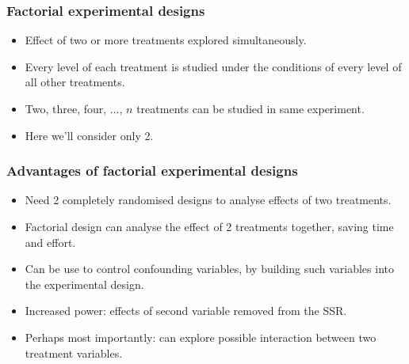 \documentclass[12pt,xcolor=dvipsnames,handout,mathserif,aspectratio=169]{beamer}
\begin{document}
\begin{frame}
\frametitle{Factorial experimental designs}
\begin{itemize}
\item Effect of two or more treatments explored simultaneously.
\vspace{0.3cm}
\item Every level of each treatment is studied under the conditions of every level of all other treatments.
\vspace{0.3cm}
\item Two, three, four, $\ldots$, $n$ treatments can be studied in same experiment.
\vspace{0.3cm}
\item Here we'll consider only 2.
\end{itemize}
\end{frame}

\begin{frame}
\frametitle{Advantages of factorial experimental designs}
\begin{itemize}
\vspace{0.3cm}
\item Need 2 completely randomised designs to analyse effects of two treatments.
\vspace{0.3cm}
\item Factorial design can analyse the effect of 2 treatments together, saving time and effort.
\vspace{0.3cm}
\item Can be use to control confounding variables, by building such variables into the experimental design.
\vspace{0.3cm}
\item Increased power: effects of second variable removed from the SSR.
\vspace{0.3cm}
\item Perhaps most importantly: can explore possible interaction between two treatment variables.
\end{itemize}
\end{frame}
\end{document}
